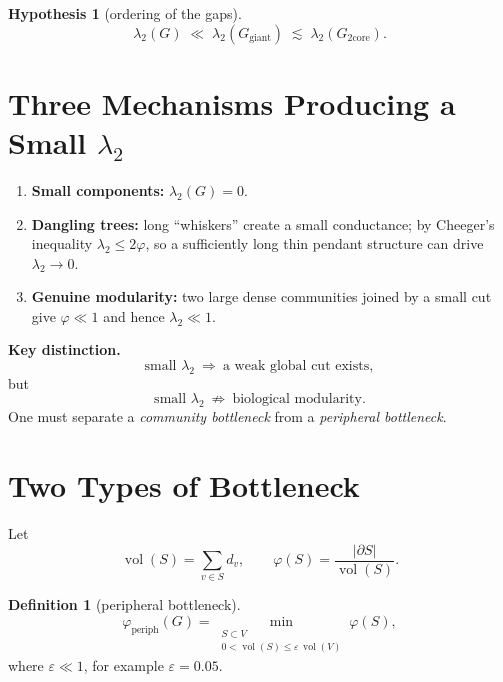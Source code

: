 \documentclass[11pt,a4paper]{article}
\theoremstyle{plain}
\newtheorem{hypothesis}{Hypothesis}
\theoremstyle{definition}
\newtheorem{definition}[theorem]{Definition}
\theoremstyle{remark}
\DeclareMathOperator{\vol}{vol}
\newcommand{\core}{\mathrm{core}}
\newcommand{\giant}{\mathrm{giant}}
\newcommand{\periph}{\mathrm{periph}}
\newcommand{\Ph}{\varphi}
\newcommand{\lamtwo}{\lambda_2}
\newcommand{\Ggiant}{G_{\giant}}
\newcommand{\Gtwo}{G_{2\core}}
\begin{document}
\begin{hypothesis}[ordering of the gaps]
\begin{equation}
\boxed{\;\lamtwo(G)\;\ll\;\lamtwo(\Ggiant)\;\lesssim\;\lamtwo(\Gtwo).\;}
\end{equation}
\end{hypothesis}

\section{Three Mechanisms Producing a Small $\lamtwo$}
\label{sec:mechanisms}

\begin{enumerate}[leftmargin=*]
\item \textbf{Small components:} $\lamtwo(G)=0$.
\item \textbf{Dangling trees:} long ``whiskers'' create a small conductance;
by Cheeger's inequality $\lamtwo\le 2\Ph$, so a sufficiently long thin pendant
structure can drive $\lamtwo\to 0$.
\item \textbf{Genuine modularity:} two large dense communities joined by a
small cut give $\Ph\ll 1$ and hence $\lamtwo\ll 1$.
\end{enumerate}

\textbf{Key distinction.}
\begin{equation}
\text{small }\lamtwo\ \Longrightarrow\ \text{a weak global cut exists},
\end{equation}
but
\begin{equation}
\text{small }\lamtwo\ \not\Longrightarrow\ \text{biological modularity}.
\end{equation}
One must separate a \emph{community bottleneck} from a \emph{peripheral
bottleneck}.

\section{Two Types of Bottleneck}
\label{sec:bottleneck}

Let
\begin{equation}
\vol(S)=\sum_{v\in S}d_v,\qquad
\Ph(S)=\frac{|\partial S|}{\vol(S)} .
\end{equation}

\begin{definition}[peripheral bottleneck]
\begin{equation}
\Ph_{\periph}(G)=
\min_{\substack{S\subset V\\ 0<\vol(S)\le\varepsilon\,\vol(V)}}\Ph(S),
\end{equation}
where $\varepsilon\ll 1$, for example $\varepsilon=0.05$.
\end{definition}
\end{document}
